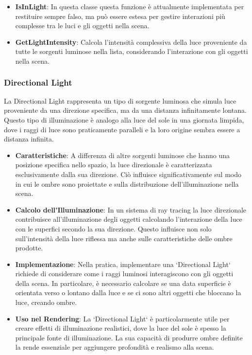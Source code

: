 \documentclass[12pt]{article}
\begin{document}
\begin{itemize}
\item \textbf{IsInLight}: In questa classe questa funzione è attualmente implementata per restituire sempre falso, ma può essere estesa per gestire interazioni più complesse tra le luci e gli oggetti nella scena.
\item \textbf{GetLightIntensity}: Calcola l'intensità complessiva della luce proveniente da tutte le sorgenti luminose nella lista, considerando l'interazione con gli oggetti nella scena.
\end{itemize}

\subsubsection{Directional Light}
La Directional Light rappresenta un tipo di sorgente luminosa che simula luce proveniente da una direzione specifica, ma da una distanza infinitamente lontana. Questo tipo di illuminazione è analogo alla luce del sole in una giornata limpida, dove i raggi di luce sono praticamente paralleli e la loro origine sembra essere a distanza infinita.

\begin{itemize}
\item \textbf{Caratteristiche}: A differenza di altre sorgenti luminose che hanno una posizione specifica nello spazio, la luce direzionale è caratterizzata esclusivamente dalla sua direzione. Ciò influisce significativamente sul modo in cui le ombre sono proiettate e sulla distribuzione dell'illuminazione nella scena.

\item \textbf{Calcolo dell'Illuminazione}: In un sistema di ray tracing la luce direzionale contribuisce all'illuminazione degli oggetti calcolando l'interazione della luce con le superfici secondo la sua direzione. Questo influisce non solo sull'intensità della luce riflessa ma anche sulle caratteristiche delle ombre prodotte.

\item \textbf{Implementazione}: Nella pratica, implementare una `Directional Light` richiede di considerare come i raggi luminosi interagiscono con gli oggetti della scena. In particolare, è necessario calcolare se una data superficie è orientata verso o lontano dalla luce e se ci sono altri oggetti che bloccano la luce, creando ombre.

\item \textbf{Uso nel Rendering}: La `Directional Light` è particolarmente utile per creare effetti di illuminazione realistici, dove la luce del sole è spesso la principale fonte di illuminazione. La sua capacità di produrre ombre definite la rende essenziale per aggiungere profondità e realismo alla scena.
\end{itemize}
\end{document}
